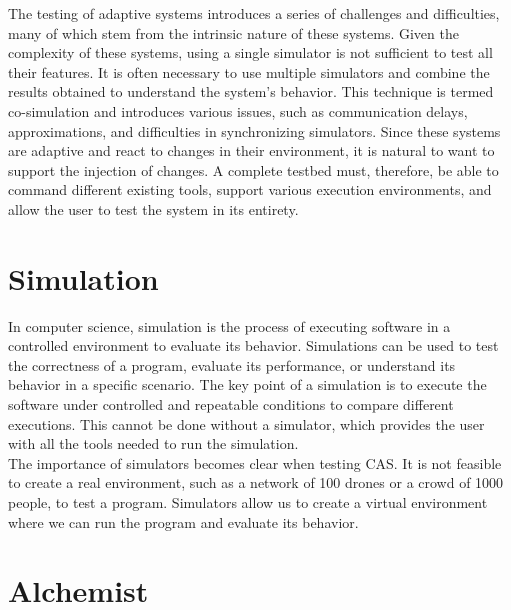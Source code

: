 \documentclass[12pt,a4paper,openright,twoside]{book}
\begin{document}
The testing of adaptive systems introduces a series of challenges and difficulties, many of which stem from the intrinsic nature of these systems. 
Given the complexity of these systems, using a single simulator is not sufficient to test all their features. 
It is often necessary to use multiple simulators and combine the results obtained to understand the system's behavior. 
This technique is termed co-simulation and introduces various issues, such as communication delays, approximations, and difficulties in synchronizing simulators. \cite{DBLP:journals/simpra/ThuleLGML19}
Since these systems are adaptive and react to changes in their environment, it is natural to want to support the injection of changes. \cite{DBLP:conf/icac/BrownHHLLSY04}
A complete testbed must, therefore, be able to command different existing tools, support various execution environments, and allow the user to test the system in its entirety.

\section{Simulation}

In computer science, simulation is the process of executing software in a controlled environment to evaluate its behavior. 
Simulations can be used to test the correctness of a program, evaluate its performance, or understand its behavior in a specific scenario. 
The key point of a simulation is to execute the software under controlled and repeatable conditions to compare different executions. \cite{DBLP:journals/cacm/CollbergP16}
This cannot be done without a simulator, which provides the user with all the tools needed to run the simulation. \cite{argun2021simulation, bagrodia1998parsec} \\
The importance of simulators becomes clear when testing \ac{CAS}. 
It is not feasible to create a real environment, such as a network of 100 drones or a crowd of 1000 people, to test a program.
Simulators allow us to create a virtual environment where we can run the program and evaluate its behavior. \\

\section{Alchemist}
\end{document}
